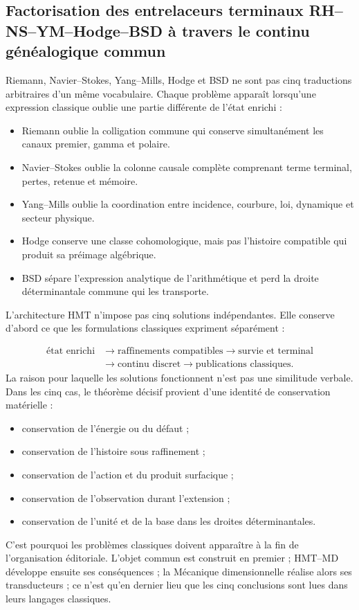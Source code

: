 \subsection{Factorisation des entrelaceurs terminaux RH–NS–YM–Hodge–BSD à travers le continu généalogique commun}
Riemann, Navier–Stokes, Yang–Mills, Hodge et BSD ne sont pas cinq traductions arbitraires d’un même vocabulaire. Chaque problème apparaît lorsqu’une expression classique oublie une partie différente de l’état enrichi :\par
\begin{itemize}
\item Riemann oublie la colligation commune qui conserve simultanément les canaux premier, gamma et polaire.
\item Navier–Stokes oublie la colonne causale complète comprenant terme terminal, pertes, retenue et mémoire.
\item Yang–Mills oublie la coordination entre incidence, courbure, loi, dynamique et secteur physique.
\item Hodge conserve une classe cohomologique, mais pas l’histoire compatible qui produit sa préimage algébrique.
\item BSD sépare l’expression analytique de l’arithmétique et perd la droite déterminantale commune qui les transporte.
\end{itemize}
L’architecture HMT n’impose pas cinq solutions indépendantes. Elle conserve d’abord ce que les formulations classiques expriment séparément :\par
\[
\begin{aligned}
\text{état enrichi}
&\longrightarrow \text{raffinements compatibles}
\longrightarrow \text{survie et terminal}\\
&\longrightarrow \text{continu discret}
\longrightarrow \text{publications classiques}.
\end{aligned}
\]
La raison pour laquelle les solutions fonctionnent n’est pas une similitude verbale. Dans les cinq cas, le théorème décisif provient d’une identité de conservation matérielle :\par
\begin{itemize}
\item conservation de l’énergie ou du défaut ;
\item conservation de l’histoire sous raffinement ;
\item conservation de l’action et du produit surfacique ;
\item conservation de l’observation durant l’extension ;
\item conservation de l’unité et de la base dans les droites déterminantales.
\end{itemize}
C’est pourquoi les problèmes classiques doivent apparaître à la fin de l’organisation éditoriale. L’objet commun est construit en premier ; HMT–MD développe ensuite ses conséquences ; la Mécanique dimensionnelle réalise alors ses transducteurs ; ce n’est qu’en dernier lieu que les cinq conclusions sont lues dans leurs langages classiques.\par
{}
